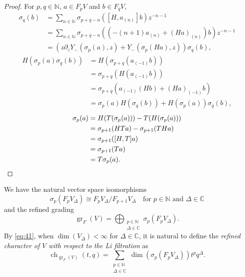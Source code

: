 \documentclass[a4paper, 12pt, reqno]{amsart}
\theoremstyle{remark}
\DeclareMathOperator{\gr}{gr}
\DeclareMathOperator{\ch}{ch}
\begin{document}
\begin{proof}
  For $p, q \in \mathbb{N}$, $a \in F_pV$ and $b \in F_qV$,
  \begin{align*}
    [H, Y_-(\sigma_p(a), z)]\sigma_q(b) &= \sum_{n \in \mathbb{N}}\sigma_{p + q - n}([H, a_{(n)}]b)z^{-n - 1} \\
                                        &= \sum_{n \in \mathbb{N}}\sigma_{p + q - n}((-(n + 1)a_{(n)} + (Ha)_{(n)})b)z^{-n - 1} \\
                                        &= (z\partial_zY_-(\sigma_p(a), z) + Y_-(\sigma_p(Ha), z))\sigma_q(b),
  \end{align*}
  \begin{align*}
    H(\sigma_p(a)\sigma_q(b)) &= H(\sigma_{p + q}(a_{(-1)}b)) \\
                              &= \sigma_{p + q}(H(a_{(-1)}b)) \\
                              &= \sigma_{p + q}(a_{(-1)}(Hb) + (Ha)_{(-1)}b) \\
                              &= \sigma_p(a)H(\sigma_q(b)) + H(\sigma_p(a))\sigma_q(b),
  \end{align*}
  \begin{align*}
    [H, T]\sigma_p(a) &= H(T(\sigma_p(a))) - T(H(\sigma_p(a))) \\
                      &= \sigma_{p + 1}(HTa) - \sigma_{p + 1}(THa) \\
                      &= \sigma_{p + 1}([H, T]a) \\
                      &= \sigma_{p + 1}(Ta) \\
                      &= T\sigma_p(a). \qedhere
  \end{align*}
\end{proof}

We have the natural vector space isomorphisms
\begin{equation*}
  \sigma_p(F_pV_{\Delta}) \cong F_pV_{\Delta}/F_{p + 1}V_{\Delta} \quad \text{for $p \in \mathbb{N}$ and $\Delta \in \mathbb{C}$}
\end{equation*}
and the refined grading
\begin{equation}
  \label{eq:41}
  \gr_F(V) = \bigoplus_{\substack{p \in \mathbb{N} \\ \Delta \in \mathbb{C}}}\sigma_p(F_pV_{\Delta}).
\end{equation}
By \eqref{eq:41}, when $\dim(V_{\Delta}) < \infty$ for $\Delta \in \mathbb{C}$, it is natural to define the \emph{refined character of $V$ with respect to the Li filtration} as
\begin{equation*}
  \ch_{\gr_F(V)}(t, q) = \sum_{\substack{p \in \mathbb{N} \\ \Delta \in \mathbb{C}}}\dim(\sigma_p(F_pV_{\Delta}))t^pq^{\Delta}.
\end{equation*}
\end{document}
